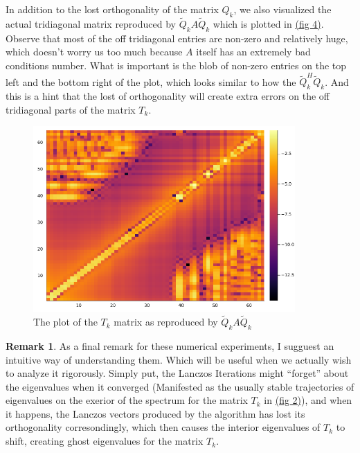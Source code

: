 \documentclass[]{article}
\theoremstyle{definition}
\newtheorem{remark}{Remark}[subsection]
\begin{document}
            In addition to the lost orthogonality of the matrix $Q_k$, we also visualized the actual tridiagonal matrix reproduced by $\tilde{Q}_kA\tilde{Q}_k$ which is plotted in \hyperref[fig:4]{(fig 4)}. Observe that most of the off tridiagonal entries are non-zero and relatively huge, which doesn't worry us too much because $A$ itself has an extremely bad conditions number. What is important is the blob of non-zero entries on the top left and the bottom right of the plot, which looks similar to how the $\tilde{Q}_k^H\tilde{Q}_k$. And this is a hint that the lost of orthogonality will create extra errors on the off tridiagonal parts of the matrix $T_k$. 
            \begin{figure}[H]\label{fig:4}
                \centering
                \includegraphics[width=10cm]{fig4.png}
                \caption{The plot of the $T_k$ matrix as reproduced by $\tilde{Q}_kA\tilde{Q}_k$}
            \end{figure}
            \begin{remark}
                As a final remark for these numerical experiments, I sugguest an intuitive way of understanding them. Which will be useful when we actually wish to analyze it rigorously. Simply put, the Lanczos Iterations might ``forget'' about the eigenvalues when it converged (Manifested as the usually stable trajectories of eigenvalues on the exerior of the spectrum for the matrix $T_k$ in \hyperref[fig:2]{(fig 2)}), and when it happens, the Lanczos vectors produced by the algorithm has lost its orthogonality corresondingly, which then causes the interior eigenvalues of $T_k$ to shift, creating ghost eigenvalues for the matrix $T_k$. 
            \end{remark}
        
\end{document}
